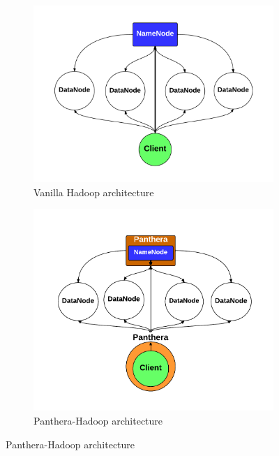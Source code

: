 \documentclass[12pt]{article}
\begin{document}
\begin{figure}
\centering
\begin{subfigure}{.5\textwidth}
  \centering
  \includegraphics[scale=0.4]{assets/hadoop_architecture.pdf}
  \caption{Vanilla Hadoop architecture}
  \label{fig:vanilla_arch}
\end{subfigure}%
\begin{subfigure}{.5\textwidth}
  \centering
  \includegraphics[scale=0.4]{assets/panthera_architecture.pdf}
  \caption{Panthera-Hadoop architecture}
  \label{fig:panthera_arch}
\end{subfigure}
\label{fig:arch}
\end{figure}
\end{document}
